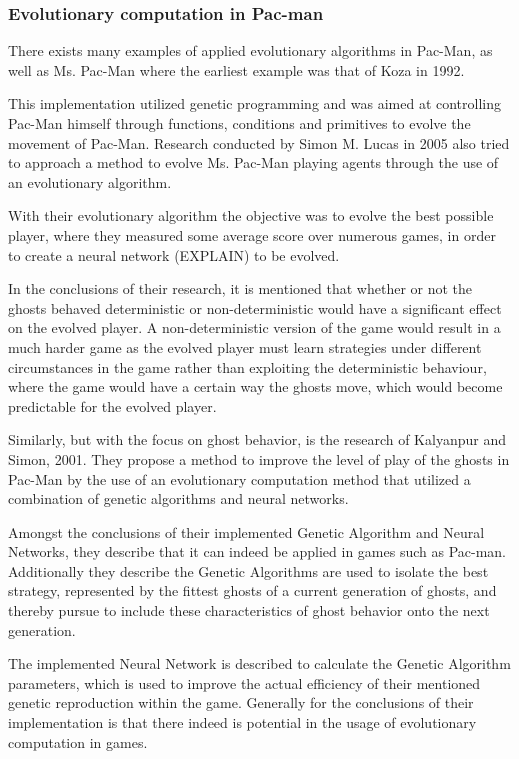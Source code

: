 \subsubsection{Evolutionary computation in Pac-man}


There exists many examples of applied evolutionary algorithms in Pac-Man, as well as Ms. Pac-Man where the earliest example was that of Koza in 1992.\cite{Koza1992}

This implementation utilized genetic programming and was aimed at controlling Pac-Man himself through functions, conditions and primitives to evolve the movement of Pac-Man. \cite[pp. 2]{Lucas2005}
Research conducted by Simon M. Lucas in 2005 also tried to approach a method to evolve Ms. Pac-Man playing agents through the use of an evolutionary algorithm. \cite{Lucas2005}

With their evolutionary algorithm the objective was to evolve the best possible player, where they measured some average score over numerous games, in order to create a neural network (EXPLAIN) to be evolved. \cite[pp. 8]{Lucas2005}

In the conclusions of their research, it is mentioned that whether or not the ghosts behaved deterministic or non-deterministic would have a significant effect on the evolved player. A non-deterministic version of the game would result in a much harder game as the evolved player must learn strategies under different circumstances in the game rather than exploiting the deterministic behaviour, where the game would have a certain way the ghosts move, which would become predictable for the evolved player.\cite[pp. 8]{Lucas2005}

Similarly, but with the focus on ghost behavior, is the research of Kalyanpur and Simon, 2001. They propose a method to improve the level of play of the ghosts in Pac-Man by the use of an evolutionary computation method that utilized a combination of genetic algorithms and neural networks. \cite{Kalyanpur2001}

Amongst the conclusions of their implemented Genetic Algorithm and Neural Networks, they describe that it can indeed be applied in games such as Pac-man. Additionally they describe the Genetic Algorithms are used to isolate the best strategy, represented by the fittest ghosts of a current generation of ghosts, and thereby pursue to include these characteristics of ghost behavior onto the next generation. \cite[pp. 8]{Kalyanpur2001}

The implemented Neural Network is described to calculate the Genetic Algorithm parameters, which is used to improve the actual efficiency of their mentioned genetic reproduction within the game. Generally for the conclusions of their implementation is that there indeed is potential in the usage of evolutionary computation in games.

